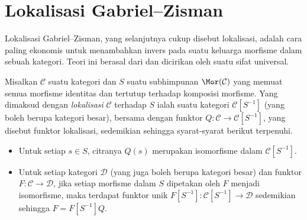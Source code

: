 
\section{Lokalisasi Gabriel--Zisman}\label{sec:cat-localization}
\hypertarget{o014.aljabr2.chapter1.gabriel-zisman-localization}{ }

Lokalisasi Gabriel--Zisman, yang selanjutnya cukup disebut lokalisasi, adalah
cara paling ekonomis untuk menambahkan invers pada suatu keluarga morfisme
dalam sebuah kategori. Teori ini berasal dari \cite{GZ67} dan dicirikan oleh
suatu sifat universal.

\begin{definisi}\label{def:cat-localization}
	Misalkan $\mathcal{C}$ suatu kategori dan $S$ suatu subhimpunan
	$\Mor(\mathcal{C})$ yang memuat semua morfisme identitas dan tertutup
	terhadap komposisi morfisme. Yang dimaksud dengan \emph{lokalisasi}
	$\mathcal{C}$ terhadap $S$ ialah suatu kategori
	$\mathcal{C}[S^{-1}]$ (yang boleh berupa kategori besar), bersama dengan
	funktor $Q: \mathcal{C} \to \mathcal{C}[S^{-1}]$, yang disebut funktor
	lokalisasi, sedemikian sehingga syarat-syarat berikut terpenuhi.
	\begin{itemize}
		\item Untuk setiap $s \in S$, citranya $Q(s)$ merupakan isomorfisme
		dalam $\mathcal{C}[S^{-1}]$.
		\item Untuk setiap kategori $\mathcal{D}$ (yang juga boleh berupa
		kategori besar) dan funktor $F: \mathcal{C} \to \mathcal{D}$, jika
		setiap morfisme dalam $S$ dipetakan oleh $F$ menjadi isomorfisme, maka
		terdapat funktor unik
		$F[S^{-1}]: \mathcal{C}[S^{-1}] \to \mathcal{D}$ sedemikian sehingga
		$F = F[S^{-1}] Q$.
	\end{itemize}
\end{definisi}

